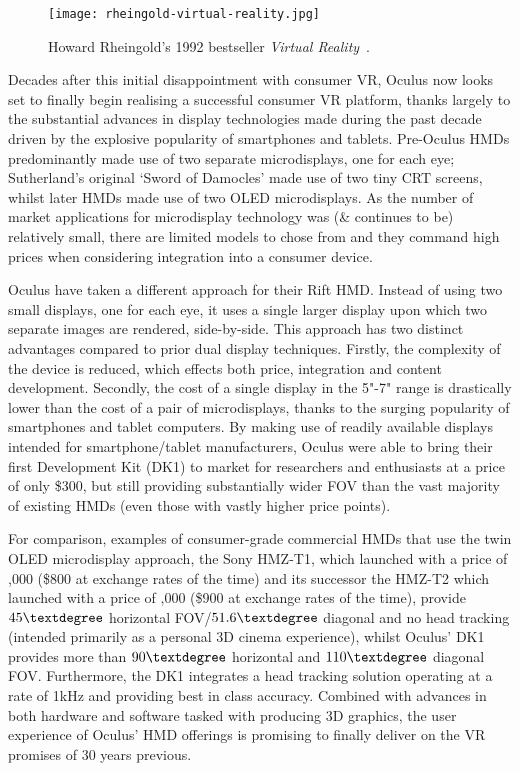 \begin{figure}[h]
	\begin{center}
		\texttt{[image: rheingold-virtual-reality.jpg]}
		\caption{Howard Rheingold's 1992 bestseller \textit{Virtual Reality}~\cite{Rheingold1992}.}
		\label{rheingold-virtual-reality.jpg}
	\end{center}
\end{figure}

Decades after this initial disappointment with consumer VR, Oculus now looks set to finally begin realising a successful consumer VR platform, thanks largely to the substantial advances in display technologies made during the past decade driven by the explosive popularity of smartphones and tablets. Pre-Oculus HMDs predominantly made use of two separate microdisplays, one for each eye; Sutherland's original `Sword of Damocles' made use of two tiny CRT screens, whilst later HMDs made use of two OLED microdisplays. As the number of market applications for microdisplay technology was (\& continues to be) relatively small, there are limited models to chose from and they command high prices when considering integration into a consumer device.

Oculus have taken a different approach for their Rift HMD. Instead of using two small displays, one for each eye, it uses a single larger display upon which two separate images are rendered, side-by-side. This approach has two distinct advantages compared to prior dual display techniques. Firstly, the complexity of the device is reduced, which effects both price, integration and content development. Secondly, the cost of a single display in the 5"-7" range is drastically lower than the cost of a pair of microdisplays, thanks to the surging popularity of smartphones and tablet computers. By making use of readily available displays intended for smartphone/tablet manufacturers, Oculus were able to bring their first Development Kit (DK1) to market for researchers and enthusiasts at a price of only \$300, but still providing substantially wider FOV than the vast majority of existing HMDs (even those with vastly higher price points).

For comparison, examples of consumer-grade commercial HMDs that use the twin OLED microdisplay approach, the Sony HMZ-T1, which launched with a price of ,000 (\$800 at exchange rates of the time) and its successor the HMZ-T2 which launched with a price of ,000 (\$900 at exchange rates of the time), provide $45\textdegree$ horizontal FOV/$51.6\textdegree$ diagonal and no head tracking (intended primarily as a personal 3D cinema experience), whilst Oculus' DK1 provides more than $90\textdegree$ horizontal and $110\textdegree$ diagonal FOV. Furthermore, the DK1 integrates a head tracking solution operating at a rate of 1kHz and providing best in class accuracy. Combined with advances in both hardware and software tasked with producing 3D graphics, the user experience of Oculus' HMD offerings is promising to finally deliver on the VR promises of 30 years previous.

